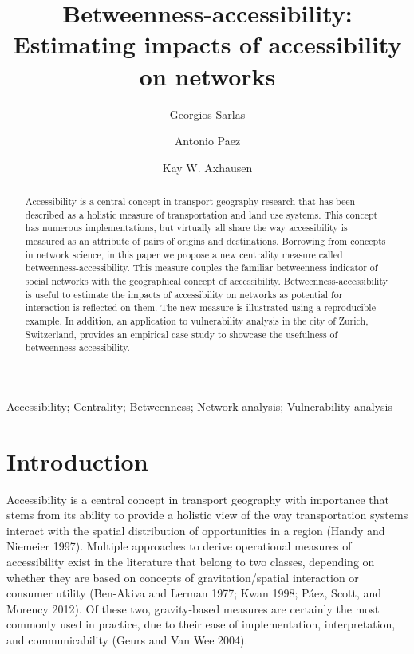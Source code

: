 \documentclass[]{elsarticle} %
\begin{document}
\begin{frontmatter}

  \title{Betweenness-accessibility: Estimating impacts of accessibility on
networks}
    \author[ETH]{Georgios Sarlas}
    \author[McMaster University]{Antonio Paez}
    \author[ETH]{Kay W. Axhausen}
      \address[ETH]{ETH Zurich, Institute for Transport Planning and Systems,
Stefano-Franscini-Platz 5, 8093 Zurich, Switzerland}
    \address[McMaster University]{School of Geography and Earth Sciences, 1280 Main St W, Hamilton,
Ontario, L8S 1S4 Canada}
    
  \begin{abstract}
  Accessibility is a central concept in transport geography research that
  has been described as a holistic measure of transportation and land use
  systems. This concept has numerous implementations, but virtually all
  share the way accessibility is measured as an attribute of pairs of
  origins and destinations. Borrowing from concepts in network science, in
  this paper we propose a new centrality measure called
  betweenness-accessibility. This measure couples the familiar betweenness
  indicator of social networks with the geographical concept of
  accessibility. Betweenness-accessibility is useful to estimate the
  impacts of accessibility on networks as potential for interaction is
  reflected on them. The new measure is illustrated using a reproducible
  example. In addition, an application to vulnerability analysis in the
  city of Zurich, Switzerland, provides an empirical case study to
  showcase the usefulness of betweenness-accessibility.
  \end{abstract}
   \begin{keyword} Accessibility; Centrality; Betweenness; Network analysis; Vulnerability
analysis\end{keyword}
 \end{frontmatter}

\hypertarget{introduction}{%
\section{Introduction}\label{introduction}}

Accessibility is a central concept in transport geography with
importance that stems from its ability to provide a holistic view of the
way transportation systems interact with the spatial distribution of
opportunities in a region (Handy and Niemeier 1997). Multiple approaches
to derive operational measures of accessibility exist in the literature
that belong to two classes, depending on whether they are based on
concepts of gravitation/spatial interaction or consumer utility
(Ben-Akiva and Lerman 1977; Kwan 1998; Páez, Scott, and Morency 2012).
Of these two, gravity-based measures are certainly the most commonly
used in practice, due to their ease of implementation, interpretation,
and communicability (Geurs and Van Wee 2004).
\end{document}
